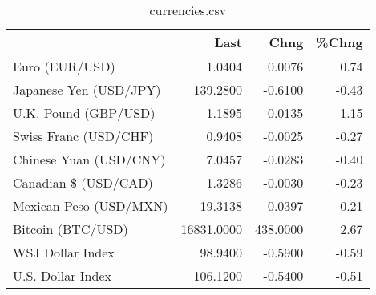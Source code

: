 \documentclass{article}%
\begin{document}
%


\begin{table}[htbp]%
\caption{currencies.csv}%
\centering%
\begin{adjustbox}{width=1\textwidth}%
\begin{tabular}{lrrr}
\toprule
                       &       Last &     Chng &  \%Chng \\
\midrule
        Euro (EUR/USD) &     1.0404 &   0.0076 &   0.74 \\
Japanese Yen (USD/JPY) &   139.2800 &  -0.6100 &  -0.43 \\
  U.K. Pound (GBP/USD) &     1.1895 &   0.0135 &   1.15 \\
 Swiss Franc (USD/CHF) &     0.9408 &  -0.0025 &  -0.27 \\
Chinese Yuan (USD/CNY) &     7.0457 &  -0.0283 &  -0.40 \\
  Canadian \$ (USD/CAD) &     1.3286 &  -0.0030 &  -0.23 \\
Mexican Peso (USD/MXN) &    19.3138 &  -0.0397 &  -0.21 \\
     Bitcoin (BTC/USD) & 16831.0000 & 438.0000 &   2.67 \\
      WSJ Dollar Index &    98.9400 &  -0.5900 &  -0.59 \\
     U.S. Dollar Index &   106.1200 &  -0.5400 &  -0.51 \\
\bottomrule
\end{tabular}
%
\end{adjustbox}%
\end{table}

%
\end{document}
